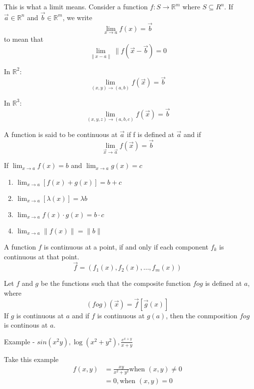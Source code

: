 \documentclass[twoside]{report}
\begin{document}
This is what a limit means.
Consider a function $f : S \rightarrow \mathbb{R}^m$ where $S \subseteq R^n$. If $\vec{a} \in \mathbb{R}^n$ and $\vec{b} \in \mathbb{R}^m$, we write 
\[
   \lim_{x \rightarrow a} f(x) = \vec{b}
\]
to mean that
\[
   \lim_{\|x - a\|} \|f(\vec{x} -\vec{b})=0
\]

In $\mathbb{R}^2$:
\[
   \lim_{(x,y) \rightarrow (a,b)} f(\vec{x}) = \vec{b}
\]

In $\mathbb{R}^3$:
\[
   \lim_{(x,y,z) \rightarrow (a,b,c)} f(\vec{x}) = \vec{b}
\]

A function is said to be continuous at $\vec{a}$ if f is defined at $\vec{a}$ and if 
\[
   \lim_{\vec{x}\rightarrow \vec{a}}f(\vec{x})  = \vec{b}
\]
\begin{theorem}
   If $\lim_{x \rightarrow a} f(x) = b$ and $\lim_{x \rightarrow a} g(x) = c$ 

   \begin{enumerate}
      \item $\lim_{x \rightarrow a}[f(x) + g(x)] = b + c$
      \item $\lim_{x \rightarrow a}[\lambda (x)] = \lambda b$ 
      \item $\lim_{x \rightarrow a}f(x)\cdot g(x) = b\cdot c$
   \item $\lim_{x \rightarrow a} \|f(x)\| = \|b\|$
   \end{enumerate}

\end{theorem}
A function $f$ is continuous at a point, if and only if each component $f_k$ is continuous at that point. 
\[
   \vec{f} = (f_1(x),f_2(x),\dots,f_m(x))
\]
	
\begin{theorem}
	Let $f$ and $g$ be the functions such that the composite function $fog$ is defined at $a$, where
	\begin{displaymath}
	   (f o g)(\vec{x}) = \vec{f}[\vec{g}(x)]
	\end{displaymath}
	If $g$ is continuous at $a$ and if $f$ is continuous at $g(a)$, then the conmposition $fog$ is continous at $a$.
	
\end{theorem}
Example - 
$sin(x^2y), \log(x^2 + y^2), \frac{e^{x+y}}{x+y}$

Take this example
\begin{align*}
   f(x,y) &= \frac{xy}{x^2 + y^2} \text{when } (x,y) \neq 0\\
	  &= 0, \text{when } (x,y) = 0 
\end{align*}
\end{document}
